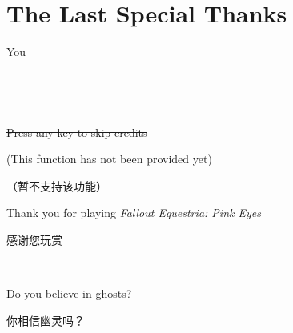 \clearpage




% 

~\vfill

\section*{The Last Special Thanks}

\begin{center}

    \Large You

\end{center}

~\vfill

\clearpage


~\vfill

\begin{center}

\begin{englishpar}
    \sout{Press any key to skip credits}
    
    (This function has not been provided yet)
\end{englishpar}


（暂不支持该功能）

\begin{englishpar}
    Thank you for playing \emph{Fallout Equestria: Pink Eyes}
\end{englishpar}

感谢您玩赏
\end{center}

~\vfill


\begin{motto}
    Do you believe in ghosts?

    你相信幽灵吗？
\end{motto}

